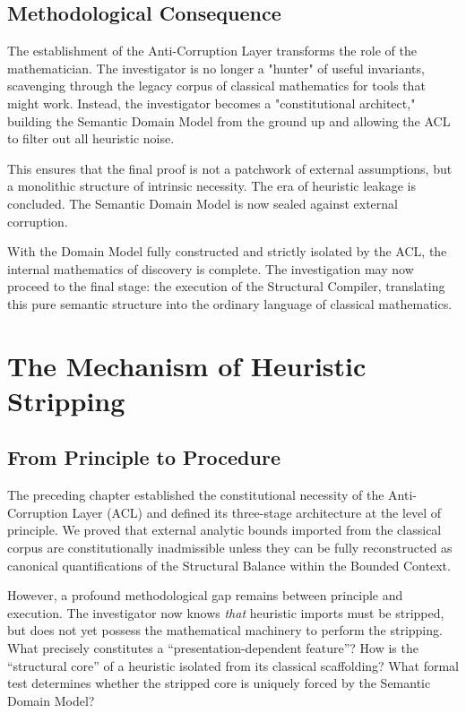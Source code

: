 \documentclass[12pt,openany]{extbook}
\theoremstyle{plain}
\theoremstyle{definition}
\begin{document}
\section{Methodological Consequence}

The establishment of the Anti-Corruption Layer transforms the role of the mathematician. The investigator is no longer a "hunter" of useful invariants, scavenging through the legacy corpus of classical mathematics for tools that might work. Instead, the investigator becomes a "constitutional architect," building the Semantic Domain Model from the ground up and allowing the ACL to filter out all heuristic noise.

This ensures that the final proof is not a patchwork of external assumptions, but a monolithic structure of intrinsic necessity. The era of heuristic leakage is concluded. The Semantic Domain Model is now sealed against external corruption. 

With the Domain Model fully constructed and strictly isolated by the ACL, the internal mathematics of discovery is complete. The investigation may now proceed to the final stage: the execution of the Structural Compiler, translating this pure semantic structure into the ordinary language of classical mathematics.

\chapter{The Mechanism of Heuristic Stripping}

\section{From Principle to Procedure}

The preceding chapter established the constitutional necessity of the Anti-Corruption Layer (ACL) and defined its three-stage architecture at the level of principle. We proved that external analytic bounds imported from the classical corpus are constitutionally inadmissible unless they can be fully reconstructed as canonical quantifications of the Structural Balance within the Bounded Context.

However, a profound methodological gap remains between principle and execution. The investigator now knows \emph{that} heuristic imports must be stripped, but does not yet possess the mathematical machinery to perform the stripping. What precisely constitutes a ``presentation-dependent feature''? How is the ``structural core'' of a heuristic isolated from its classical scaffolding? What formal test determines whether the stripped core is uniquely forced by the Semantic Domain Model?
\end{document}
